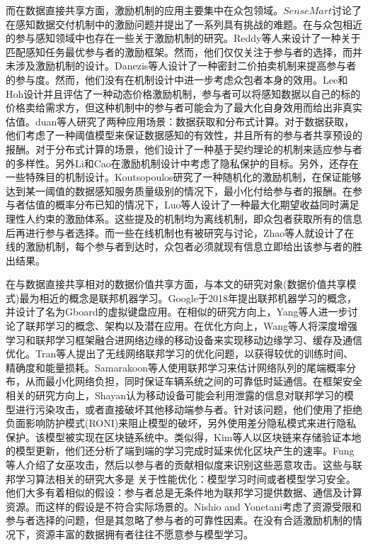 \documentclass[promaster]{thesis-uestc}
\begin{document}
而在数据直接共享方面，激励机制的应用主要集中在众包领域。$SenseMart$讨论了在感知数据交付机制中的激励问题并提出了一系列具有挑战的难题。在与众包相近的参与感知领域中也存在一些关于激励机制的研究。Reddy等人来设计了一种关于匹配感知任务最优参与者的激励框架。然而，他们仅仅关注于参与者的选择，而并未涉及激励机制的设计。Danezis等人设计了一种密封二价拍卖机制来提高参与者的参与度。然而，他们没有在机制设计中进一步考虑众包者本身的效用。Lee和Hoh设计并且评估了一种动态价格激励机制，参与者可以将感知数据以自己的标的价格卖给需求方，但这种机制中的参与者可能会为了最大化自身效用而给出非真实估值。duan等人研究了两种应用场景：数据获取和分布式计算。对于数据获取，他们考虑了一种阈值模型来保证数据感知的有效性，并且所有的参与者共享预设的报酬。对于分布式计算的场景，他们设计了一种基于契约理论的机制来适应参与者的多样性。另外Li和Cao在激励机制设计中考虑了隐私保护的目标。另外，还存在一些特殊目的机制设计。Koutsopoulos研究了一种随机化的激励机制，在保证能够达到某一阈值的数据感知服务质量级别的情况下，最小化付给参与者的报酬。在参与者估值的概率分布已知的情况下，Luo等人设计了一种最大化期望收益同时满足理性人约束的激励体系。这些提及的机制均为离线机制，即众包者获取所有的信息后再进行参与者选择。而一些在线机制也有被研究与讨论，Zhao等人就设计了在线的激励机制，每个参与者到达时，众包者必须就现有信息立即给出该参与者的胜出结果。

在与数据直接共享相对的数据价值共享方面，与本文的研究对象(数据价值共享模式)最为相近的概念是联邦机器学习。Google于2018年提出联邦机器学习的概念，并设计了名为Gboard的虚拟键盘应用。在相似的研究方向上，Yang等人进一步讨论了联邦学习的概念、架构以及潜在应用。在优化方向上，Wang等人将深度增强学习和联邦学习框架融合进网络边缘的移动设备来实现移动边缘学习、缓存及通信优化。Tran等人提出了无线网络联邦学习的优化问题，以获得较优的训练时间、精确度和能量损耗。Samarakoon等人使用联邦学习来估计网络队列的尾端概率分布，从而最小化网络负担，同时保证车辆系统之间的可靠低时延通信。在框架安全相关的研究方向上，Shayan认为移动设备可能会利用泄露的信息对联邦学习的模型进行污染攻击，或者直接破坏其他移动端参与者。针对该问题，他们使用了拒绝负面影响防护模式(RONI)来阻止模型的破坏，另外使用差分隐私模式来进行隐私保护。该模型被实现在区块链系统中。类似得，Kim等人以区块链来存储验证本地的模型更新，他们还分析了端到端的学习完成时延来优化区块产生的速率。Fung等人介绍了女巫攻击，然后以参与者的贡献相似度来识别这些恶意攻击。这些与联邦学习算法相关的研究大多是 关于性能优化：模型学习时间或者模型学习安全。他们大多有着相似的假设：参与者总是无条件地为联邦学习提供数据、通信及计算资源。而这样的假设是不符合实际场景的。Nishio and Yonetani考虑了资源受限和参与者选择的问题，但是其忽略了参与者的可靠性因素。在没有合适激励机制的情况下，资源丰富的数据拥有者往往不愿意参与模型学习。
\end{document}
